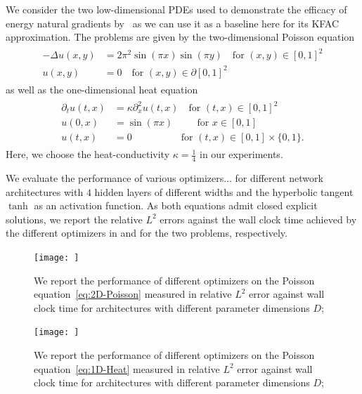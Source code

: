 We consider the two low-dimensional PDEs used to demonstrate the efficacy of energy natural gradients by~\cite{muller2023achieving}
as we can use it as a baseline here for its KFAC approximation. 
The problems are given by the two-dimensional Poisson equation 
\begin{align}\label{eq:2D-Poisson}
    \begin{split}
        -\Delta u(x,y) & = 2\pi^2 \sin(\pi x) \sin(\pi y) \quad \text{for } (x,y)\in[0,1]^2 \\ 
    u(x,y) & = 0 \quad \text{for } (x,y) \in\partial[0,1]^2
    \end{split}
\end{align}
as well as the one-dimensional heat equation 
\begin{align}\label{eq:1D-Heat}
    \begin{split}
        \partial_t u(t,x) &= \kappa\partial_x^2u(t,x) \quad \text{for }(t,x)\in[0,1]^2
        \\
        u(0,x) &= \sin(\pi x) \qquad\;\, \text{for }x\in[0,1]
        \\
        u(t,x) &= 0 \qquad\qquad\quad\text{for }(t,x)\in[0,1]\times\{0,1\}.
    \end{split}
\end{align}
Here, we choose the heat-conductivity $\kappa = \frac14$ in our experiments. 

We evaluate the performance of various optimizers... for different network architectures with $4$ hidden layers of different widths and the hyperbolic tangent $\tanh$ as an activation function. 
As both equations admit closed explicit solutions, we report the relative $L^2$ errors against the wall clock time achieved by the different optimizers in  and  for the two problems, respectively. 

\begin{figure}
    \centering
    \texttt{[image: ]}
    \caption{We report the performance of different optimizers on the Poisson equation~\eqref{eq:2D-Poisson} measured in relative $L^2$ error against wall clock time for architectures with different parameter dimensions $D$; }
    \label{fig:2D-Poisson}
\end{figure}

\begin{figure}
    \centering
    \texttt{[image: ]}
    \caption{We report the performance of different optimizers on the Poisson equation~\eqref{eq:1D-Heat} measured in relative $L^2$ error against wall clock time for architectures with different parameter dimensions $D$; }
    \label{fig:1D-heat}
\end{figure}


